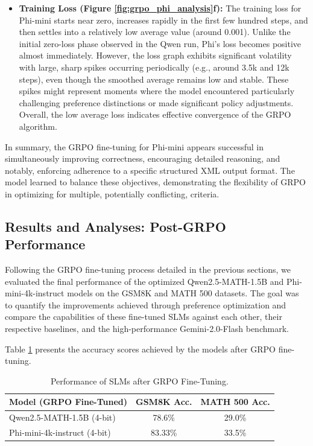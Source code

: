 \documentclass[11pt]{article}
\begin{document}
\begin{itemize}
\begin{itemize}
    \item \textbf{Training Loss (Figure \ref{fig:grpo_phi_analysis}f):} The training loss for Phi-mini starts near zero, increases rapidly in the first few hundred steps, and then settles into a relatively low average value (around 0.001). Unlike the initial zero-loss phase observed in the Qwen run, Phi's loss becomes positive almost immediately. However, the loss graph exhibits significant volatility with large, sharp spikes occurring periodically (e.g., around 3.5k and 12k steps), even though the smoothed average remains low and stable. These spikes might represent moments where the model encountered particularly challenging preference distinctions or made significant policy adjustments. Overall, the low average loss indicates effective convergence of the GRPO algorithm.
\end{itemize}

In summary, the GRPO fine-tuning for Phi-mini appears successful in simultaneously improving correctness, encouraging detailed reasoning, and notably, enforcing adherence to a specific structured XML output format. The model learned to balance these objectives, demonstrating the flexibility of GRPO in optimizing for multiple, potentially conflicting, criteria.

\subsection{Results and Analyses: Post-GRPO Performance}

Following the GRPO fine-tuning process detailed in the previous sections, we evaluated the final performance of the optimized Qwen2.5-MATH-1.5B and Phi-mini-4k-instruct models on the GSM8K and MATH 500 datasets. The goal was to quantify the improvements achieved through preference optimization and compare the capabilities of these fine-tuned SLMs against each other, their respective baselines, and the high-performance Gemini-2.0-Flash benchmark.

Table \ref{tab:grpo_performance} presents the accuracy scores achieved by the models after GRPO fine-tuning.

\begin{table}[htbp]
\centering
\caption{Performance of SLMs after GRPO Fine-Tuning.}
\label{tab:grpo_performance}
\begin{tabular}{@{}l c c@{}}
\toprule
\textbf{Model (GRPO Fine-Tuned)} & \textbf{GSM8K Acc.} & \textbf{MATH 500 Acc.} \\
\midrule
Qwen2.5-MATH-1.5B (4-bit) & 78.6\% & 29.0\% \\
Phi-mini-4k-instruct (4-bit) & 83.33\% & 33.5\% \\
\bottomrule
\end{tabular}
\end{table}


\end{itemize}
\end{document}

